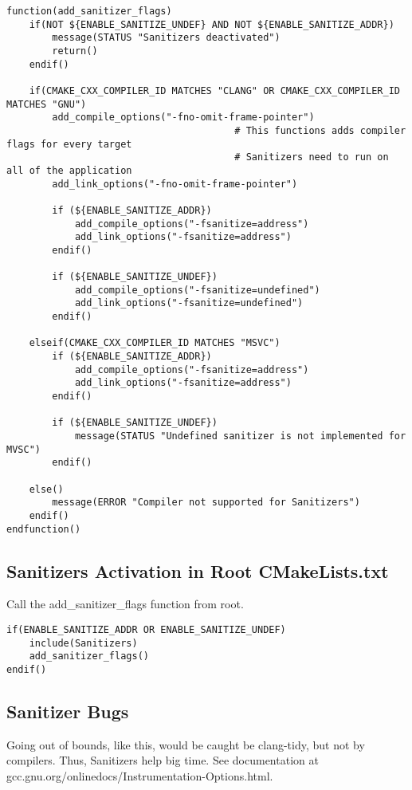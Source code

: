 \documentclass[openany]{report}
\begin{document}
\begin{verbatim}
function(add_sanitizer_flags)
    if(NOT ${ENABLE_SANITIZE_UNDEF} AND NOT ${ENABLE_SANITIZE_ADDR})
        message(STATUS "Sanitizers deactivated") 
        return()
    endif()

    if(CMAKE_CXX_COMPILER_ID MATCHES "CLANG" OR CMAKE_CXX_COMPILER_ID MATCHES "GNU")
        add_compile_options("-fno-omit-frame-pointer")   
                                        # This functions adds compiler flags for every target
                                        # Sanitizers need to run on all of the application
        add_link_options("-fno-omit-frame-pointer")

        if (${ENABLE_SANITIZE_ADDR})
            add_compile_options("-fsanitize=address") 
            add_link_options("-fsanitize=address") 
        endif()

        if (${ENABLE_SANITIZE_UNDEF})
            add_compile_options("-fsanitize=undefined") 
            add_link_options("-fsanitize=undefined") 
        endif()

    elseif(CMAKE_CXX_COMPILER_ID MATCHES "MSVC")
        if (${ENABLE_SANITIZE_ADDR})
            add_compile_options("-fsanitize=address") 
            add_link_options("-fsanitize=address") 
        endif()

        if (${ENABLE_SANITIZE_UNDEF})
            message(STATUS "Undefined sanitizer is not implemented for MVSC")
        endif()

    else() 
        message(ERROR "Compiler not supported for Sanitizers")
    endif()
endfunction()
\end{verbatim}


\subsection{Sanitizers Activation in Root CMakeLists.txt}

Call the add\_sanitizer\_flags function from root.

\begin{verbatim}
if(ENABLE_SANITIZE_ADDR OR ENABLE_SANITIZE_UNDEF)
    include(Sanitizers)
    add_sanitizer_flags()
endif()
\end{verbatim}

\subsection{Sanitizer Bugs}

Going out of bounds, like this, would be caught be clang-tidy, but not by compilers. Thus, Sanitizers help big time. See documentation at
gcc.gnu.org/onlinedocs/Instrumentation-Options.html.
\end{document}
